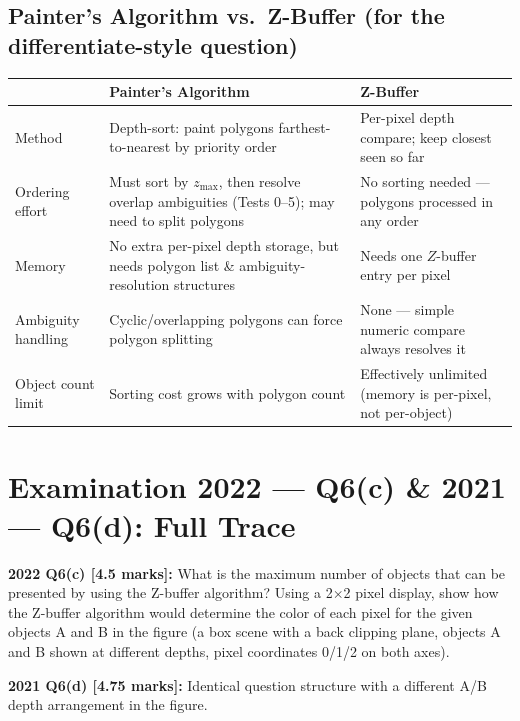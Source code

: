 \documentclass[12pt, a4paper]{article}
\newenvironment{solutionbox}{\begin{mdframed}[style=solutionframe]}{\end{mdframed}}
\newenvironment{answerbox}{\begin{mdframed}[style=answerframe]}{\end{mdframed}}
\begin{document}
\subsection{Painter's Algorithm vs.\ Z-Buffer (for the differentiate-style question)}
\begin{answerbox}
\begin{center}
\begin{tabular}{p{4.3cm}p{5.3cm}p{5.3cm}}
\toprule
 & \textbf{Painter's Algorithm} & \textbf{Z-Buffer} \\
\midrule
Method & Depth-sort: paint polygons farthest-to-nearest by priority order & Per-pixel depth compare; keep closest seen so far \\
Ordering effort & Must sort by $z_{\max}$, then resolve overlap ambiguities (Tests 0--5); may need to split polygons & No sorting needed --- polygons processed in any order \\
Memory & No extra per-pixel depth storage, but needs polygon list \& ambiguity-resolution structures & Needs one $Z$-buffer entry per pixel \\
Ambiguity handling & Cyclic/overlapping polygons can force polygon splitting & None --- simple numeric compare always resolves it \\
Object count limit & Sorting cost grows with polygon count & Effectively unlimited (memory is per-pixel, not per-object) \\
\bottomrule
\end{tabular}
\end{center}
\end{answerbox}

\section{Examination 2022 --- Q6(c) \& 2021 --- Q6(d): Full Trace}
\begin{solutionbox}
\textbf{2022 Q6(c) [4.5 marks]:} What is the maximum number of objects that can be presented by using the Z-buffer algorithm? Using a 2$\times$2 pixel display, show how the Z-buffer algorithm would determine the color of each pixel for the given objects A and B in the figure (a box scene with a back clipping plane, objects A and B shown at different depths, pixel coordinates 0/1/2 on both axes).

\textbf{2021 Q6(d) [4.75 marks]:} Identical question structure with a different A/B depth arrangement in the figure.
\end{solutionbox}
\end{document}
